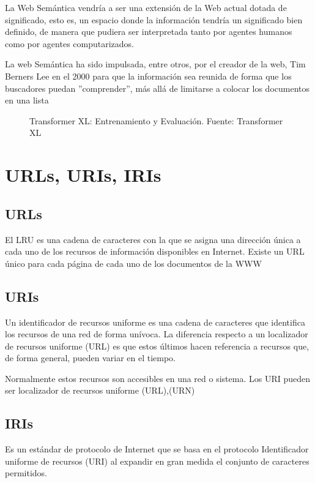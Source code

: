 \documentclass[conference]{IEEEtran}
\begin{document}
La Web Semántica vendría a ser una extensión de la Web actual dotada de significado, esto es, un espacio donde la información tendría un significado bien definido, de manera que pudiera ser interpretada tanto por agentes humanos como por agentes computarizados.

\vspace{0.2cm}

La web Semántica ha sido impulsada, entre otros, por el creador de la web, Tim Berners Lee en el 2000 para que la información sea reunida de forma que los buscadores puedan ''comprender'', más allá de limitarse a colocar los documentos en una lista

\begin{figure}[h]
	\caption{Transformer XL: Entrenamiento y Evaluación. Fuente: Transformer XL \cite{b7}}
\end{figure}

\section{URLs, URIs, IRIs}
\subsection{URLs}
El LRU es una cadena de caracteres con la que se asigna una dirección única a cada uno de los recursos de información disponibles en Internet. Existe un URL único para cada página de cada uno de los documentos de la WWW

\subsection{URIs}
Un identificador de recursos uniforme es una cadena de caracteres que identifica los recursos de una red de forma unívoca. La diferencia respecto a un localizador de recursos uniforme (URL) es que estos últimos hacen referencia a recursos que, de forma general, pueden variar en el tiempo. 

Normalmente estos recursos son accesibles en una red o sistema. Los URI pueden ser localizador de recursos uniforme (URL),(URN)
\subsection{IRIs}
Es un estándar de protocolo de Internet que se basa en el protocolo Identificador uniforme de recursos (URI) al expandir en gran medida el conjunto de caracteres permitidos.
\end{document}
